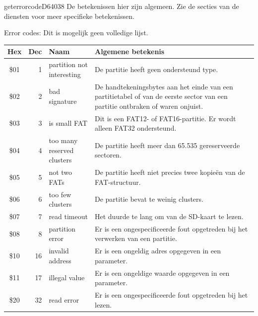 \begin{hyppotrap}{geterrorcode}{D640}{38}
  De betekenissen hier zijn algemeen. Zie de secties van de diensten voor meer  specifieke betekenissen.\item [Error codes:] Dit is mogelijk geen volledige lijst.
{
  \begin{longtable}{|c|r|l|p{8cm}|}
    \hline
    \textbf{Hex} & \textbf{Dec} & \textbf{Naam} & \textbf{Algemene betekenis}\\
    \hline
    \endhead
    \index{Hyppo-foutcodes!\$01}
    \$01 & 1 & \makecell[tl]{partition not \\ interesting} &    De partitie heeft geen ondersteund type.
    \\\hline
    \index{Hyppo-foutcodes!\$02}
    \$02 & 2 & bad signature &    De handtekeningsbytes aan het einde van een partitietabel of van de eerste sector    van een partitie ontbraken of waren onjuist.
    \\\hline
    \index{Hyppo-foutcodes!\$03}
    \$03 & 3 & is small FAT &    Dit is een FAT12- of FAT16-partitie. Er wordt alleen FAT32 ondersteund.
    \\\hline
    \index{Hyppo-foutcodes!\$04}
    \$04 & 4 & \makecell[tl]{too many reserved\\clusters} &    De partitie heeft meer dan 65.535 gereserveerde sectoren.
    \\\hline
    \index{Hyppo-foutcodes!\$05}
    \$05 & 5 & not two FATs &    De partitie heeft niet precies twee kopieën van de FAT-structuur.
    \\\hline
    \index{Hyppo-foutcodes!\$06}
    \$06 & 6 & too few clusters &    De partitie bevat te weinig clusters.
    \\\hline
    \index{Hyppo-foutcodes!\$07}
    \$07 & 7 & read timeout &    Het duurde te lang om van de SD-kaart te lezen.
    \\\hline
    \index{Hyppo-foutcodes!\$08}
    \$08 & 8 & partition error &    Er is een ongespecificeerde fout opgetreden bij het verwerken van een partitie.
    \\\hline
    \index{Hyppo-foutcodes!\$10}
    \$10 & 16 & invalid address &    Er is een ongeldig adres opgegeven in een parameter.
    \\\hline
    \index{Hyppo-foutcodes!\$11}
    \$11 & 17 & illegal value &    Er is een ongeldige waarde opgegeven in een parameter.
    \\\hline
    \index{Hyppo-foutcodes!\$20}
    \$20 & 32 & read error &    Er is een ongespecificeerde fout opgetreden bij het lezen.

\end{longtable}}
\end{hyppotrap}
